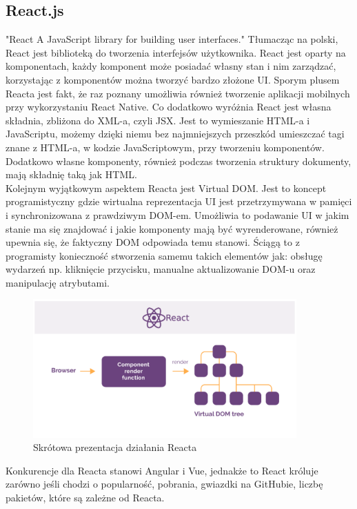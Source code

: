 \documentclass[12pt]{article}
\begin{document}
\begin{sloppypar}
{  \subsection{React.js}
  {
    "React A JavaScript library for building user interfaces."\cite{react} Tłumacząc na polski, React jest biblioteką do tworzenia interfejsów użytkownika. 
    React jest oparty na komponentach, każdy komponent może posiadać własny stan i nim zarządzać, korzystając z komponentów można tworzyć bardzo złożone UI. 
    Sporym plusem Reacta jest fakt, że raz poznany umożliwia również tworzenie aplikacji mobilnych przy wykorzystaniu React Native. Co dodatkowo wyróżnia React 
    jest własna składnia, zbliżona do XML-a, czyli JSX. Jest to wymieszanie HTML-a i JavaScriptu, możemy dzięki niemu bez najmniejszych przeszkód umieszczać 
    tagi znane z HTML-a, w kodzie JavaScriptowym, przy tworzeniu komponentów. Dodatkowo własne komponenty, również podczas tworzenia struktury dokumenty, mają 
    składnię taką jak HTML. \\
    Kolejnym wyjątkowym aspektem Reacta jest Virtual DOM. Jest to koncept programistyczny gdzie wirtualna reprezentacja UI jest 
    przetrzymywana w pamięci i synchronizowana z prawdziwym DOM-em. 
    Umożliwia to podawanie UI w jakim stanie ma się znajdować i jakie komponenty mają być wyrenderowane, również upewnia się, że faktyczny DOM odpowiada temu stanowi. 
    Ściągą to z programisty konieczność stworzenia samemu takich elementów jak: obsługę wydarzeń np. kliknięcie przycisku, manualne aktualizowanie DOM-u oraz manipulację atrybutami.
    \begin{figure}[H]
      \centering
      \includegraphics[width=0.9\textwidth]{how_react_works.PNG}
      \caption{Skrótowa prezentacja działania Reacta}
      \label{fig:how-react-works}
    \end{figure}
    Konkurencje dla Reacta stanowi Angular i Vue, jednakże to React króluje zarówno jeśli chodzi o popularność, pobrania, gwiazdki na GitHubie, liczbę pakietów, które są zależne od Reacta. 
}}
\end{sloppypar}
\end{document}
